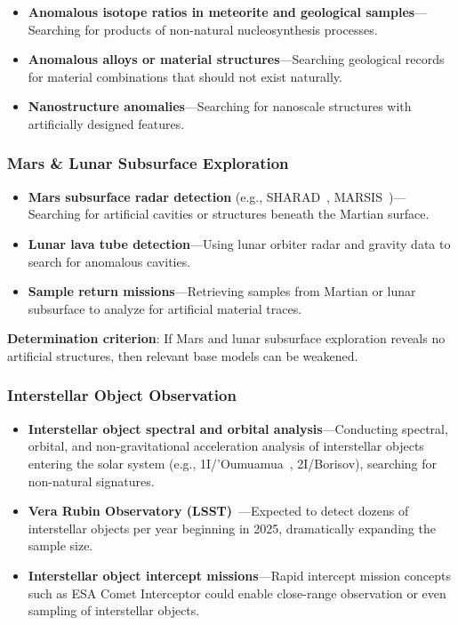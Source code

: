 \documentclass[aps,prd,twocolumn,superscriptaddress,nofootinbib]{revtex4-2}
\begin{document}
\begin{itemize}
  \item \textbf{Anomalous isotope ratios in meteorite and geological samples}---Searching for products of non-natural nucleosynthesis processes.
  \item \textbf{Anomalous alloys or material structures}---Searching geological records for material combinations that should not exist naturally.
  \item \textbf{Nanostructure anomalies}---Searching for nanoscale structures with artificially designed features.
\end{itemize}

\subsubsection{Mars \& Lunar Subsurface Exploration}\label{sec:mars-lunar}

\begin{itemize}
  \item \textbf{Mars subsurface radar detection} (e.g., SHARAD~\cite{NASA_SHARAD}, MARSIS~\cite{ESA_MARSIS})---Searching for artificial cavities or structures beneath the Martian surface.
  \item \textbf{Lunar lava tube detection}---Using lunar orbiter radar and gravity data to search for anomalous cavities.
  \item \textbf{Sample return missions}---Retrieving samples from Martian or lunar subsurface to analyze for artificial material traces.
\end{itemize}

\textbf{Determination criterion}: If Mars and lunar subsurface exploration reveals no artificial structures, then relevant base models can be weakened.

\subsubsection{Interstellar Object Observation}\label{sec:interstellar-objects}

\begin{itemize}
  \item \textbf{Interstellar object spectral and orbital analysis}---Conducting spectral, orbital, and non-gravitational acceleration analysis of interstellar objects entering the solar system (e.g., 1I/'Oumuamua~\cite{Meech2017}, 2I/Borisov), searching for non-natural signatures.
  \item \textbf{Vera Rubin Observatory (LSST)}~\cite{Ivezic2019}---Expected to detect dozens of interstellar objects per year beginning in 2025, dramatically expanding the sample size.
  \item \textbf{Interstellar object intercept missions}---Rapid intercept mission concepts such as ESA Comet Interceptor could enable close-range observation or even sampling of interstellar objects.
\end{itemize}
\end{document}
